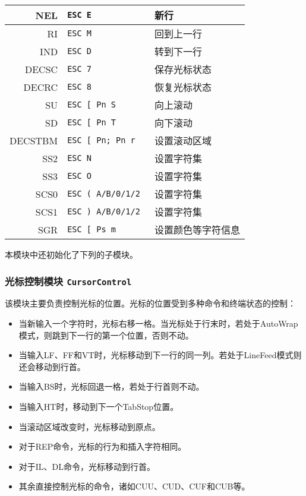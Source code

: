\begin{longtable}{|r|l|l|}
NEL & \texttt{ESC E }&新行 \\ \hline
RI & \texttt{ESC M }& 回到上一行 \\ \hline
IND & \texttt{ESC D }&转到下一行 \\ \hline
DECSC & \texttt{ESC 7}& 保存光标状态 \\ \hline
DECRC &\texttt{ESC 8}& 恢复光标状态 \\ \hline \hline

SU & \texttt{ESC [ Pn S }&向上滚动 \\ \hline
SD & \texttt{ESC [ Pn T }&向下滚动 \\ \hline
DECSTBM & \texttt{ESC [ Pn; Pn r }&设置滚动区域 \\ \hline \hline

SS2 & \texttt{ESC N}&设置字符集 \\ \hline
SS3 & \texttt{ESC O}&设置字符集 \\ \hline
SCS0 & \texttt{ESC ( A/B/0/1/2 }& 设置字符集 \\ \hline
SCS1 & \texttt{ESC ) A/B/0/1/2 }&设置字符集 \\ \hline \hline

SGR & \texttt{ESC [ Ps m }&设置颜色等字符信息 \\ \hline
\end{longtable}

本模块中还初始化了下列的子模块。

\subsubsection{光标控制模块 \texttt{CursorControl}}
该模块主要负责控制光标的位置。光标的位置受到多种命令和终端状态的控制：

\begin{itemize}
	\item 当新输入一个字符时，光标右移一格。当光标处于行末时，若处于AutoWrap模式，则跳到下一行的第一个位置，否则不动。
	\item 当输入LF、FF和VT时，光标移动到下一行的同一列。若处于LineFeed模式则还会移动到行首。
	\item 当输入BS时，光标回退一格，若处于行首则不动。
	\item 当输入HT时，移动到下一个TabStop位置。
	\item 当滚动区域改变时，光标移动到原点。
	\item 对于REP命令，光标的行为和插入字符相同。
	\item 对于IL、DL命令，光标移动到行首。
	\item 其余直接控制光标的命令，诸如CUU、CUD、CUF和CUB等。
\end{itemize}

